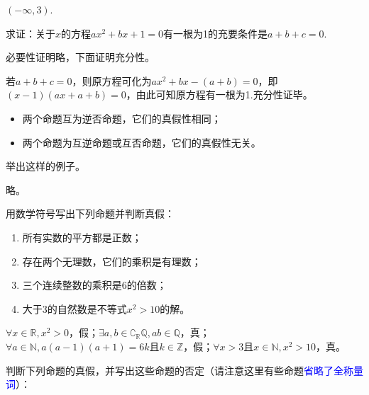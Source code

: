 \documentclass[lang=cn,newtx,10pt,scheme=chinese]{elegantbook}
\begin{document}
\begin{solution}
  $(-\infty,3)$.
\end{solution}

\begin{exercise}\label{zhw2000_g1_P51.78}
  求证：关于$x$的方程$ax^2+bx+1=0$有一根为1的充要条件是$a+b+c=0$.
\end{exercise}

\begin{solution}
  必要性证明略，下面证明充分性。

  若$a+b+c=0$，则原方程可化为$ax^2+bx-(a+b)=0$，即$(x-1)(ax+a+b)=0$，由此可知原方程有一根为1.充分性证毕。
\end{solution}

\hspace*{\fill}
\begin{itemize}
  \item 两个命题互为逆否命题，它们的真假性相同；
  \item 两个命题为互逆命题或互否命题，它们的真假性无关。
\end{itemize}
\begin{problem}
  举出这样的例子。
\end{problem}
\begin{solution}
  略。
\end{solution}

\begin{exercise}
  用数学符号写出下列命题并判断真假：
\end{exercise}

\begin{enumerate}
  \item 所有实数的平方都是正数；
  \item 存在两个无理数，它们的乘积是有理数；
  \item 三个连续整数的乘积是6的倍数；
  \item 大于3的自然数是不等式$x^2>10$的解。
\end{enumerate}

\begin{solution}
  $\forall x\in\mathbb{R},x^2>0$，假；$\exists a,b\in\complement_{\mathbb{R}}\mathbb{Q},ab\in\mathbb{Q}$，真；$\forall a\in\mathbb{N},a(a-1)(a+1)=6k\text{且}k\in\mathbb{Z}$，假；$\forall x>3\text{且}x\in\mathbb{N},x^2>10$，真。
\end{solution}

\begin{exercise}
  判断下列命题的真假，并写出这些命题的否定（请注意这里有些命题\textcolor{blue}{省略了全称量词}）：
\end{exercise}
\end{document}

